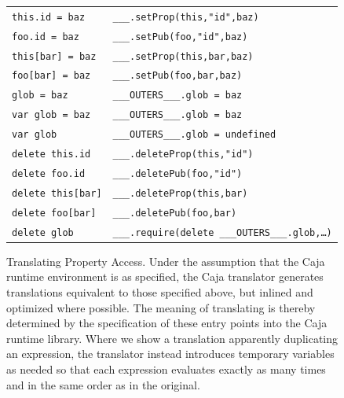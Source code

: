 \documentclass[letterpaper,twocolumn,10pt]{article}
\newcommand{\code}[1]{{\tt {#1}}}              %
\begin{document}
\begin{figure}
\begin{tabular}{ll}
  \hline
  \code{this.id = baz}    & \code{\_\_\_.setProp(this,"id",baz)} \\
  \code{foo.id = baz}     & \code{\_\_\_.setPub(foo,"id",baz)} \\
  \code{this[bar] = baz}  & \code{\_\_\_.setProp(this,bar,baz)} \\
  \code{foo[bar] = baz}   & \code{\_\_\_.setPub(foo,bar,baz)} \\
  \code{glob = baz}       & \code{\_\_\_OUTERS\_\_\_.glob = baz} \\
  \code{var glob = baz}   & \code{\_\_\_OUTERS\_\_\_.glob = baz} \\
  \code{var glob}         & \code{\_\_\_OUTERS\_\_\_.glob = undefined} \\
  \hline               
  \code{delete this.id}   & \code{\_\_\_.deleteProp(this,"id")} \\
  \code{delete foo.id}    & \code{\_\_\_.deletePub(foo,"id")} \\
  \code{delete this[bar]} & \code{\_\_\_.deleteProp(this,bar)} \\
  \code{delete foo[bar]}  & \code{\_\_\_.deletePub(foo,bar)} \\
  \code{delete glob}      
         & \code{\_\_\_.require(delete \_\_\_OUTERS\_\_\_.glob,\ldots)} \\
\end{tabular}

\caption[Translating Property Access]{Translating Property Access. Under the 
assumption that the Caja runtime environment is as specified, the Caja 
translator generates translations equivalent to those specified above, but 
inlined and optimized where possible. The meaning of translating is thereby 
determined by the specification of these entry points into the Caja runtime 
library. Where we show a translation apparently duplicating an expression, 
the translator instead introduces temporary variables as needed so that each 
expression evaluates exactly as many times and in the same order as in the 
original.}
\label{tab:prop-xlate}
\end{figure}
\end{document}
